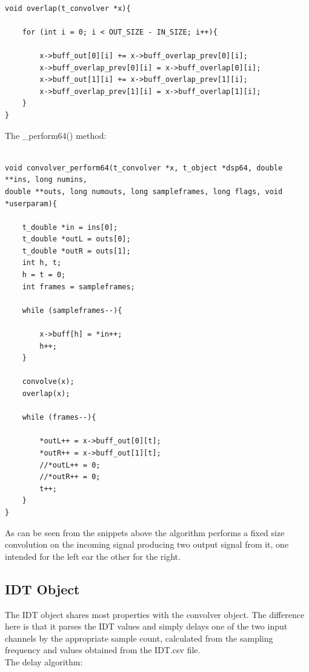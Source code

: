\documentclass[a4paper,12pt,oneside]{article}
\begin{document}
\begin{verbatim}

void overlap(t_convolver *x){

	for (int i = 0; i < OUT_SIZE - IN_SIZE; i++){
    
		x->buff_out[0][i] += x->buff_overlap_prev[0][i];
		x->buff_overlap_prev[0][i] = x->buff_overlap[0][i];
		x->buff_out[1][i] += x->buff_overlap_prev[1][i];
		x->buff_overlap_prev[1][i] = x->buff_overlap[1][i];
	}
}

\end{verbatim}

The \_perform64() method:

\begin{verbatim}

void convolver_perform64(t_convolver *x, t_object *dsp64, double **ins, long numins, 
double **outs, long numouts, long sampleframes, long flags, void *userparam){

	t_double *in = ins[0];
	t_double *outL = outs[0];
	t_double *outR = outs[1];	
	int h, t;
	h = t = 0;
	int frames = sampleframes;
	
	while (sampleframes--){
    
		x->buff[h] = *in++;
		h++;
	}

	convolve(x);	
	overlap(x);

	while (frames--){
    
		*outL++ = x->buff_out[0][t];
		*outR++ = x->buff_out[1][t];
		//*outL++ = 0;
		//*outR++ = 0;
		t++;
	}	
}

\end{verbatim}

As can be seen from the snippets above the algorithm performs a fixed size convolution on the incoming signal producing two output signal from it, one intended for the left ear the other for the right.


\subsection{IDT Object}

The IDT object shares most properties with the convolver object. The difference here is that it parses the IDT values and simply delays one of the two input channels by the appropriate sample count, calculated from the sampling frequency and values obtained from the IDT.csv file.\\

The delay algorithm:
\end{document}
